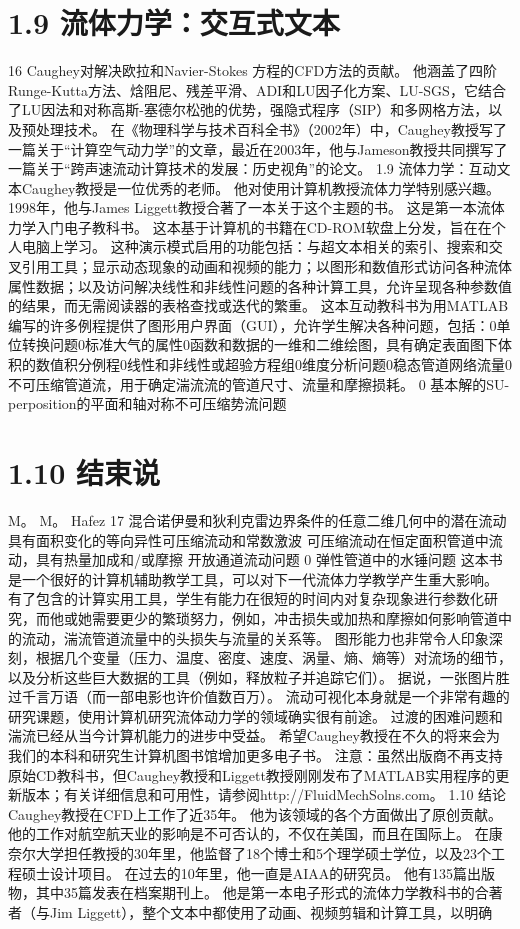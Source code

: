 \documentclass[UTF8,11pt,a4paper,openany,fontset=fandol]{ctexbook}
\begin{document}
\section{1.9 流体力学：交互式文本}
16 Caughey对解决欧拉和Navier-Stokes 方程的CFD方法的贡献。 他涵盖了四阶Runge-Kutta方法、焓阻尼、残差平滑、ADI和LU因子化方案、LU-SGS，它结合了LU因法和对称高斯-塞德尔松弛的优势，强隐式程序（SIP）和多网格方法，以及预处理技术。 在《物理科学与技术百科全书》（2002年）中，Caughey教授写了一篇关于“计算空气动力学”的文章，最近在2003年，他与Jameson教授共同撰写了一篇关于“跨声速流动计算技术的发展：历史视角”的论文。 1.9 流体力学：互动文本Caughey教授是一位优秀的老师。 他对使用计算机教授流体力学特别感兴趣。 1998年，他与James Liggett教授合著了一本关于这个主题的书。 这是第一本流体力学入门电子教科书。 这本基于计算机的书籍在CD-ROM软盘上分发，旨在在个人电脑上学习。 这种演示模式启用的功能包括：与超文本相关的索引、搜索和交叉引用工具；显示动态现象的动画和视频的能力；以图形和数值形式访问各种流体属性数据；以及访问解决线性和非线性问题的各种计算工具，允许呈现各种参数值的结果，而无需阅读器的表格查找或迭代的繁重。 这本互动教科书为用MATLAB编写的许多例程提供了图形用户界面（GUI），允许学生解决各种问题，包括：0单位转换问题0标准大气的属性0函数和数据的一维和二维绘图，具有确定表面图下体积的数值积分例程0线性和非线性或超验方程组0维度分析问题0稳态管道网络流量0不可压缩管道流，用于确定湍流流的管道尺寸、流量和摩擦损耗。 0 基本解的SU-perposition的平面和轴对称不可压缩势流问题

\section{1.10 结束说}
M。 M。 Hafez 17 混合诺伊曼和狄利克雷边界条件的任意二维几何中的潜在流动 具有面积变化的等向异性可压缩流动和常数激波 可压缩流动在恒定面积管道中流动，具有热量加成和/或摩擦 开放通道流动问题 0 弹性管道中的水锤问题 这本书是一个很好的计算机辅助教学工具，可以对下一代流体力学教学产生重大影响。 有了包含的计算实用工具，学生有能力在很短的时间内对复杂现象进行参数化研究，而他或她需要更少的繁琐努力，例如，冲击损失或加热和摩擦如何影响管道中的流动，湍流管道流量中的头损失与流量的关系等。 图形能力也非常令人印象深刻，根据几个变量（压力、温度、密度、速度、涡量、熵、熵等）对流场的细节，以及分析这些巨大数据的工具（例如，释放粒子并追踪它们）。 据说，一张图片胜过千言万语（而一部电影也许价值数百万）。 流动可视化本身就是一个非常有趣的研究课题，使用计算机研究流体动力学的领域确实很有前途。 过渡的困难问题和湍流已经从当今计算机能力的进步中受益。 希望Caughey教授在不久的将来会为我们的本科和研究生计算机图书馆增加更多电子书。 注意：虽然出版商不再支持原始CD教科书，但Caughey教授和Liggett教授刚刚发布了MATLAB实用程序的更新版本；有关详细信息和可用性，请参阅http://FluidMechSolns.com。 1.10 结论 Caughey教授在CFD上工作了近35年。 他为该领域的各个方面做出了原创贡献。 他的工作对航空航天业的影响是不可否认的，不仅在美国，而且在国际上。 在康奈尔大学担任教授的30年里，他监督了18个博士和5个理学硕士学位，以及23个工程硕士设计项目。 在过去的10年里，他一直是AIAA的研究员。 他有135篇出版物，其中35篇发表在档案期刊上。 他是第一本电子形式的流体力学教科书的合著者（与Jim Liggett），整个文本中都使用了动画、视频剪辑和计算工具，以明确
\end{document}
